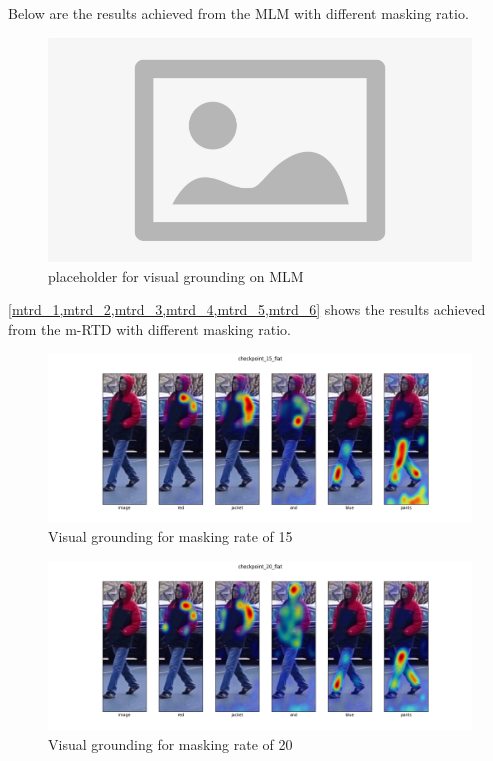 Below are the results achieved from the MLM with different masking ratio.

\begin{figure}[htbp]
  \includegraphics[width=\linewidth]{img/placeholder.png}
  \caption{placeholder for visual grounding on MLM}
  \label{mlm_1}
\end{figure}

\ref{mtrd_1,mtrd_2,mtrd_3,mtrd_4,mtrd_5,mtrd_6} shows the results achieved from the m-RTD with different masking ratio.
\begin{figure}[htbp]
  \includegraphics[width=\linewidth]{img/mrtd_masking_ratio/mrtd-checkpoint_15_flat.png}
  \caption{Visual grounding for masking rate of 15}
  \label{mtrd_1}
\end{figure}

\begin{figure}[htbp]
  \includegraphics[width=\linewidth]{img/mrtd_masking_ratio/mrtd-checkpoint_20_flat.png}
  \caption{Visual grounding for masking rate of 20}
  \label{mtrd_2}
\end{figure}

